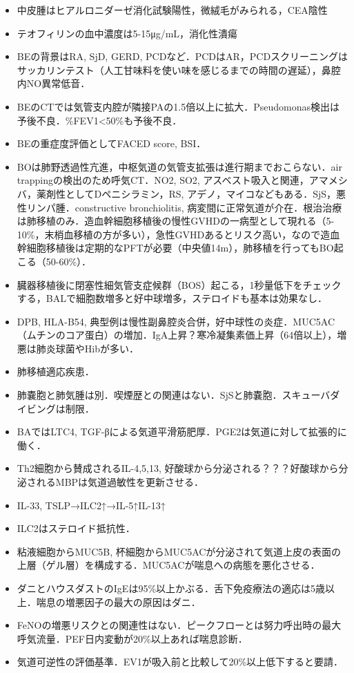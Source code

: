 \begin{itemize}


\item 中皮腫はヒアルロニダーゼ消化試験陽性，微絨毛がみられる，CEA陰性


\item テオフィリンの血中濃度は5-15μg/mL，消化性潰瘍

\item BEの背景はRA, SjD, GERD, PCDなど．PCDはAR，PCDスクリーニングはサッカリンテスト（人工甘味料を使い味を感じるまでの時間の遅延），鼻腔内NO異常低音．
\item BEのCTでは気管支内腔が隣接PAの1.5倍以上に拡大．Pseudomonas検出は予後不良．\%FEV1<50\%も予後不良．
\item BEの重症度評価としてFACED score, BSI．
\item BOは肺野透過性亢進，中枢気道の気管支拡張は進行期までおこらない．air trappingの検出のため呼気CT．NO2, SO2, アスベスト吸入と関連，アマメシバ，薬剤性としてDペニシラミン，RS, アデノ，マイコなどもある．SjS，悪性リンパ腫．constructive bronchiolitis, 病変間に正常気道が介在．根治治療は肺移植のみ．造血幹細胞移植後の慢性GVHDの一病型として現れる（5-10\%，末梢血移植の方が多い），急性GVHDあるとリスク高い，なので造血幹細胞移植後は定期的なPFTが必要（中央値14m），肺移植を行ってもBO起こる（50-60\%）．
\item 臓器移植後に閉塞性細気管支症候群（BOS）起こる，1秒量低下をチェックする，BALで細胞数増多と好中球増多，ステロイドも基本は効果なし．

\item DPB, HLA-B54, 典型例は慢性副鼻腔炎合併，好中球性の炎症．MUC5AC（ムチンのコア蛋白）の増加．IgA上昇？寒冷凝集素価上昇（64倍以上），増悪は肺炎球菌やHibが多い．


\item 肺移植適応疾患．
\item 肺嚢胞と肺気腫は別．喫煙歴との関連はない．SjSと肺嚢胞．スキューバダイビングは制限．

\item BAではLTC4, TGF-βによる気道平滑筋肥厚．PGE2は気道に対して拡張的に働く．
\item Th2細胞から賛成されるIL-4,5,13, 好酸球から分泌される？？？好酸球から分泌されるMBPは気道過敏性を更新させる．
\item IL-33, TSLP→ILC2↑→IL-5↑IL-13↑
\item ILC2はステロイド抵抗性．
\item 粘液細胞からMUC5B, 杯細胞からMUC5ACが分泌されて気道上皮の表面の上層（ゲル層）を構成する．MUC5ACが喘息への病態を悪化させる．
\item ダニとハウスダストのIgEは95\%以上かぶる．舌下免疫療法の適応は5歳以上．喘息の増悪因子の最大の原因はダニ．
\item FeNOの増悪リスクとの関連性はない．ピークフローとは努力呼出時の最大呼気流量．PEF日内変動が20\%以上あれば喘息診断．
\item 気道可逆性の評価基準．EV1が吸入前と比較して20\%以上低下すると要請．


\end{itemize}
